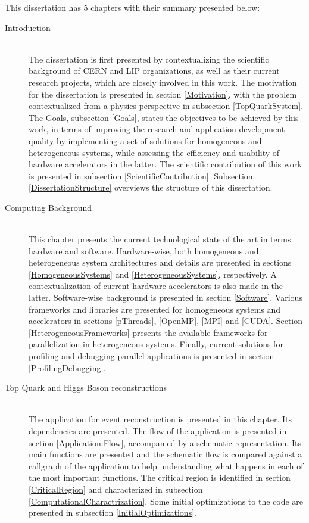 This dissertation has 5 chapters with their summary presented below:

\begin{description}
	\item[Introduction] \hfill \\
	The dissertation is first presented by contextualizing the scientific background of CERN and LIP organizations, as well as their current research projects, which are closely involved in this work. The motivation for the dissertation is presented in section \ref{Motivation}, with the problem contextualized from a physics perspective in subsection \ref{TopQuarkSystem}. The Goals, subsection \ref{Goals}, states the objectives to be achieved by this work, in terms of improving the research and application development quality by implementing a set of solutions for homogeneous and heterogeneous systems, while assessing the efficiency and usability of hardware accelerators in the latter. The scientific contribution of this work is presented in subsection \ref{ScientificContribution}. Subsection \ref{DissertationStructure} overviews the structure of this dissertation.
	\item[Computing Background] \hfill \\
	This chapter presents the current technological state of the art in terms hardware and software. Hardware-wise, both homogeneous and heterogeneous system architectures and details are presented in sections \ref{HomogeneousSystems} and \ref{HeterogeneousSystems}, respectively. A contextualization of current hardware accelerators is also made in the latter. Software-wise background is presented in section \ref{Software}. Various frameworks and libraries are presented for homogeneous systems and accelerators in sections \ref{pThreads}, \ref{OpenMP}, \ref{MPI} and \ref{CUDA}. Section \ref{HeterogeneousFrameworks} presents the available frameworks for parallelization in heterogeneous systems. Finally, current solutions for profiling and debugging parallel applications is presented in section \ref{ProfilingDebugging}.
	\item[Top Quark and Higgs Boson reconstructions] \hfill \\
	The \tth application for event reconstruction is presented in this chapter. Its dependencies are presented. The flow of the application is presented in section \ref{Application:Flow}, accompanied by a schematic representation. Its main functions are presented and the schematic flow is compared against a callgraph of the application to help understanding what happens in each of the most important functions. The critical region is identified in section \ref{CriticalRegion} and characterized in subsection \ref{ComputationalCharactrization}. Some initial optimizations to the code are presented in subsection \ref{InitialOptimizations}.

\end{description}
